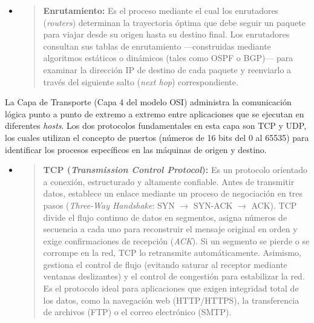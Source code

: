 
\begin{itemize}
\item
  \begin{quote}
  \textbf{Enrutamiento:} Es el proceso mediante el cual los enrutadores
  (\emph{routers}) determinan la trayectoria óptima que debe seguir un
  paquete para viajar desde su origen hasta su destino final. Los
  enrutadores consultan sus tablas de enrutamiento ---construidas
  mediante algoritmos estáticos o dinámicos (tales como OSPF o BGP)---
  para examinar la dirección IP de destino de cada paquete y reenviarlo
  a través del siguiente salto (\emph{next hop}) correspondiente.
  \end{quote}
\end{itemize}

La Capa de Transporte (Capa 4 del modelo OSI) administra la comunicación
lógica punto a punto de extremo a extremo entre aplicaciones que se
ejecutan en diferentes \emph{hosts}. Los dos protocolos fundamentales en
esta capa son TCP y UDP, los cuales utilizan el concepto de puertos
(números de 16 bits del 0 al 65535) para identificar los procesos
específicos en las máquinas de origen y destino.

\begin{itemize}
\item
  \begin{quote}
  \textbf{TCP (\emph{Transmission Control Protocol}):} Es un protocolo
  orientado a conexión, estructurado y altamente confiable. Antes de
  transmitir datos, establece un enlace mediante un proceso de
  negociación en tres pasos (\emph{Three-Way Handshake}: SYN
  \(\rightarrow\) SYN-ACK \(\rightarrow\) ACK). TCP divide el flujo
  continuo de datos en segmentos, asigna números de secuencia a cada uno
  para reconstruir el mensaje original en orden y exige confirmaciones
  de recepción (\emph{ACK}). Si un segmento se pierde o se corrompe en
  la red, TCP lo retransmite automáticamente. Asimismo, gestiona el
  control de flujo (evitando saturar al receptor mediante ventanas
  deslizantes) y el control de congestión para estabilizar la red. Es el
  protocolo ideal para aplicaciones que exigen integridad total de los
  datos, como la navegación web (HTTP/HTTPS), la transferencia de
  archivos (FTP) o el correo electrónico (SMTP).
  \end{quote}
\end{itemize}

